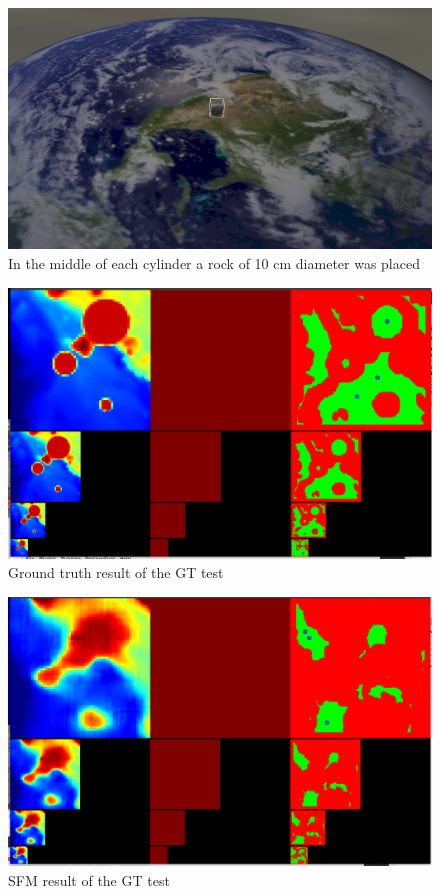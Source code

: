 \begin{figure}[ht]
\centering
\includegraphics[scale=0.18]{images/methodology/test_setup2.png}
\caption{In the middle of each cylinder a rock of 10 cm diameter was placed}
\label{fig:gt_test_setup2}
\end{figure}

\begin{figure}[ht]
\centering
\includegraphics[scale=0.22]{images/methodology/GT.png}
\caption{Ground truth result of the GT test}
\label{fig:gt_test_gt} 
\end{figure}

\begin{figure}[ht]
\centering
\includegraphics[scale=0.22]{images/methodology/SFM.png}
\caption{SFM result of the GT test}
\label{fig:gt_test_sfm}
\end{figure} 

